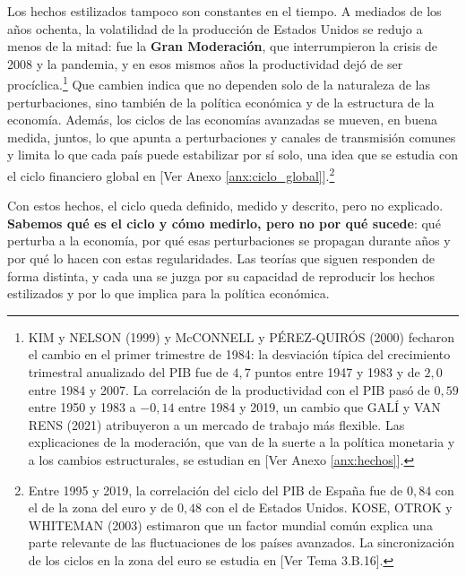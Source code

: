 \documentclass[10pt,a4paper]{article}
\newcommand{\authorfont}[1]{{\fontfamily{EBGaramond-TLF}\selectfont #1}}
\begin{document}
Los hechos estilizados tampoco son constantes en el tiempo. A mediados de los años ochenta, la volatilidad de la producción de Estados Unidos se redujo a menos de la mitad: fue la \textbf{Gran Moderación}, que interrumpieron la crisis de 2008 y la pandemia, y en esos mismos años la productividad dejó de ser procíclica.\footnote{%
    KIM y NELSON (1999) y McCONNELL y PÉREZ-QUIRÓS (2000) fecharon el cambio en el primer trimestre de 1984: la desviación típica del crecimiento trimestral anualizado del PIB fue de $4{,}7$ puntos entre 1947 y 1983 y de $2{,}0$ entre 1984 y 2007. La correlación de la productividad con el PIB pasó de $0{,}59$ entre 1950 y 1983 a $-0{,}14$ entre 1984 y 2019, un cambio que GALÍ y VAN RENS (2021) atribuyeron a un mercado de trabajo más flexible. Las explicaciones de la moderación, que van de la suerte a la política monetaria y a los cambios estructurales, se estudian en [\authorfont{Ver Anexo \ref{anx:hechos}}].
} Que cambien indica que no dependen solo de la naturaleza de las perturbaciones, sino también de la política económica y de la estructura de la economía. Además, los ciclos de las economías avanzadas se mueven, en buena medida, juntos, lo que apunta a perturbaciones y canales de transmisión comunes y limita lo que cada país puede estabilizar por sí solo, una idea que se estudia con el ciclo financiero global en [\authorfont{Ver Anexo \ref{anx:ciclo_global}}].\footnote{%
    Entre 1995 y 2019, la correlación del ciclo del PIB de España fue de $0{,}84$ con el de la zona del euro y de $0{,}48$ con el de Estados Unidos. KOSE, OTROK y WHITEMAN (2003) estimaron que un factor mundial común explica una parte relevante de las fluctuaciones de los países avanzados. La sincronización de los ciclos en la zona del euro se estudia en [\authorfont{Ver Tema 3.B.16}].
}


Con estos hechos, el ciclo queda definido, medido y descrito, pero no explicado. \textbf{Sabemos qué es el ciclo y cómo medirlo, pero no por qué sucede}: qué perturba a la economía, por qué esas perturbaciones se propagan durante años y por qué lo hacen con estas regularidades. Las teorías que siguen responden de forma distinta, y cada una se juzga por su capacidad de reproducir los hechos estilizados y por lo que implica para la política económica.











\clearpage
\end{document}
